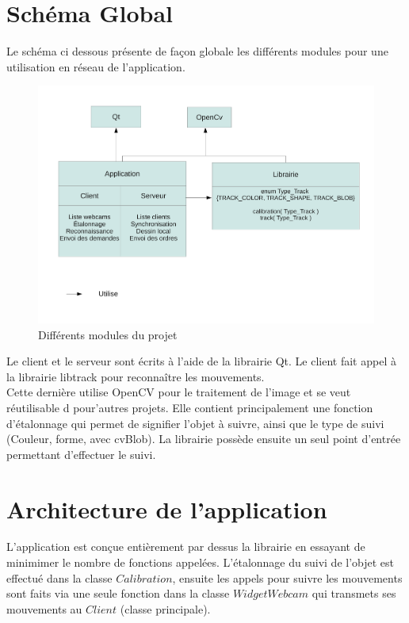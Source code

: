 \documentclass{article}
\begin{document}
\section{Schéma Global}
Le schéma ci dessous présente de façon globale les différents modules pour une utilisation en réseau de l'application.
	\begin{figure}[h]
	\begin{center}
	\includegraphics[scale=0.5]{schema_global.pdf}
	\caption{Différents modules du projet}
	\end{center}
	\end{figure}
Le client et le serveur sont écrits à l'aide de la librairie Qt. Le client fait appel à la librairie libtrack pour reconnaître les mouvements. \\
Cette dernière utilise OpenCV pour le traitement de l'image et se veut réutilisable d pour'autres projets. 
Elle contient principalement une fonction d'étalonnage qui permet de signifier l'objet à suivre, ainsi que le type de suivi (Couleur, forme, avec cvBlob). La librairie possède ensuite un seul point d'entrée permettant d'effectuer le suivi.

\newpage
\section{Architecture de l'application}
L'application est conçue entièrement par dessus la librairie en essayant de minimimer le nombre de fonctions appelées. 
L'étalonnage du suivi de l'objet est effectué dans la classe $Calibration$, ensuite les appels pour suivre les mouvements sont faits
via une seule fonction dans la classe $WidgetWebcam$ qui transmets ses mouvements au $Client$ (classe principale). \\
\end{document}
